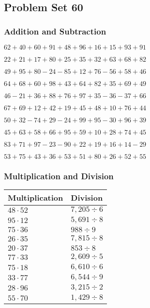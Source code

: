 \hypertarget{problem-set-60}{%
\subsection{Problem Set 60}\label{problem-set-60}}

\hypertarget{addition-and-subtraction}{%
\subsubsection{Addition and
Subtraction}\label{addition-and-subtraction}}

\(62+40+60+91+48+96+16+15+93+91\)

\(22+21+17+80+25+35+32+63+68+82\)

\(49+95+80-24-85+12+76-56+58+46\)

\(64+68+60+98+43+64+82+35+69+49\)

\(46-21+36+88+76+97+35-36-37+66\)

\(67+69+12+42+19+45+48+10+76+44\)

\(50+32-74+29-24+99+95-30+96+39\)

\(45+63+58+66+95+59+10+28+74+45\)

\(83+71+97-23-90+22+19+16+14-29\)

\(53+75+43+36+53+51+80+26+52+55\)

\hypertarget{multiplication-and-division}{%
\subsubsection{Multiplication and
Division}\label{multiplication-and-division}}

\begin{longtable}[]{@{}ll@{}}
\toprule
Multiplication & Division\tabularnewline
\midrule
\endhead
\(48\cdot52\) & \(7,205÷6\)\tabularnewline
\(95\cdot12\) & \(5,691÷8\)\tabularnewline
\(75\cdot36\) & \(988÷9\)\tabularnewline
\(26\cdot35\) & \(7,815÷8\)\tabularnewline
\(20\cdot37\) & \(853÷8\)\tabularnewline
\(77\cdot33\) & \(2,609÷5\)\tabularnewline
\(75\cdot18\) & \(6,610÷6\)\tabularnewline
\(33\cdot77\) & \(6,544÷9\)\tabularnewline
\(28\cdot96\) & \(3,215÷2\)\tabularnewline
\(55\cdot70\) & \(1,429÷8\)\tabularnewline
\bottomrule
\end{longtable}
